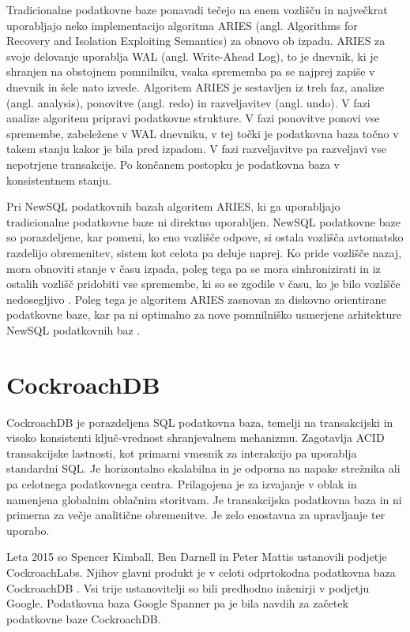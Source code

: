 \documentclass[a4paper, 12pt]{book}
\begin{document}
Tradicionalne podatkovne baze ponavadi tečejo na enem vozlišču in naj\-več\-krat uporabljajo neko implementacijo algoritma ARIES (angl. Algorithms for Recovery and Isolation Exploiting Semantics) za obnovo ob izpadu. ARIES za svoje delovanje uporablja WAL (angl. Write-Ahead Log), to je dnevnik, ki je shranjen na obstojnem pomnilniku, vsaka sprememba pa se najprej zapiše v dnevnik in šele nato izvede. Algoritem ARIES je sestavljen iz treh faz, analize (angl. analysis), ponovitve (angl. redo) in razveljavitev (angl. undo). V fazi analize algoritem pripravi podatkovne strukture. V fazi ponovitve ponovi vse spremembe, zabeležene v WAL dnevniku, v tej točki je podatkovna baza točno v takem stanju kakor je bila pred izpadom. V fazi razveljavitve pa razveljavi vse nepotrjene transakcije. Po končanem postopku je podatkovna baza v konsistentnem stanju. \cite{Pavlo2016Sep}

Pri NewSQL podatkovnih bazah algoritem ARIES, ki ga uporabljajo tradicionalne podatkovne baze ni direktno uporabljen. NewSQL podatkovne baze so porazdeljene, kar pomeni, ko eno vozlišče odpove, si ostala vozlišča avtomatsko razdelijo obremenitev, sistem kot celota pa deluje naprej. Ko pride vozlišče nazaj, mora obnoviti stanje v času izpada, poleg tega pa se mora sinhronizirati in iz ostalih vozlišč pridobiti vse spremembe, ki so se zgodile v času, ko je bilo vozlišče nedosegljivo \cite{Pavlo2016Sep}. Poleg tega je algoritem ARIES zasnovan za diskovno orientirane podatkovne baze, kar pa ni optimalno za nove pomnilniško usmerjene arhitekture NewSQL podatkovnih baz \cite{zheng2014fast}.




\chapter{CockroachDB}
\label{cockroachdb}
CockroachDB je porazdeljena SQL podatkovna baza, temelji na transakcijski in visoko konsistenti ključ-vrednost shranjevalnem mehanizmu. Zagotavlja ACID transakcijske lastnosti, kot primarni vmesnik za interakcijo pa uporablja standardni SQL. Je horizontalno skalabilna in je odporna na napake strežnika ali pa celotnega podatkovnega centra. Prilagojena je za izvajanje v oblak in namenjena globalnim oblačnim storitvam. Je transakcijska podatkovna baza in ni primerna za večje analitične obremenitve. Je zelo enostavna za upravljanje ter uporabo. \cite{CRDB-FAQ}

Leta 2015 so Spencer Kimball, Ben Darnell in Peter Mattis ustanovili podjetje CockroachLabs. Njihov glavni produkt je v celoti odprtokodna podatkovna baza CockroachDB \cite{cockroachdb/cockroach}. Vsi trije ustanovitelji so bili predhodno inženirji v podjetju Google. Podatkovna baza Google Spanner pa je bila navdih za začetek podatkovne baze CockroachDB. \cite{CRDB-2017}
\end{document}
